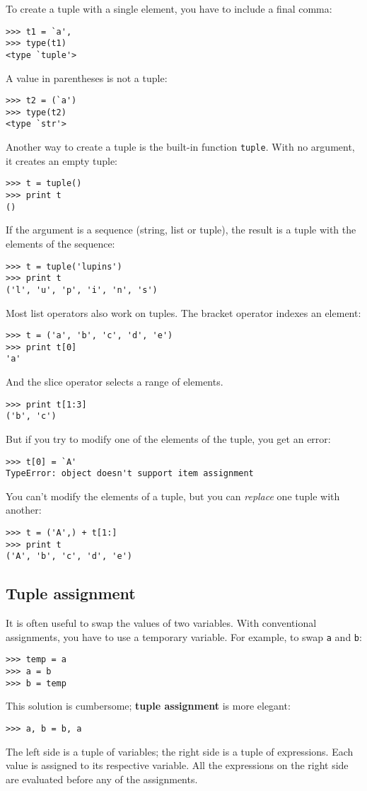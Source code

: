 \documentclass{article}
\begin{document}
To create a tuple with a single element, you have to include a final comma:
\begin{verbatim}
>>> t1 = `a',
>>> type(t1)
<type `tuple'>
\end{verbatim}
A value in parentheses is not a tuple:
\begin{verbatim}
>>> t2 = (`a')
>>> type(t2)
<type `str'>
\end{verbatim}
Another way to create a tuple is the built-in function \verb|tuple|.
With no argument, it creates an empty tuple:
\begin{verbatim}
>>> t = tuple()
>>> print t
()
\end{verbatim}
If the argument is a sequence (string, list or tuple), the result is a
tuple with the elements of the sequence:
\begin{verbatim}
>>> t = tuple('lupins')
>>> print t
('l', 'u', 'p', 'i', 'n', 's')
\end{verbatim}

Most list operators also work on tuples. The bracket operator indexes an
element:
\begin{verbatim}
>>> t = ('a', 'b', 'c', 'd', 'e')
>>> print t[0]
'a'
\end{verbatim}
And the slice operator selects a range of elements.
\begin{verbatim}
>>> print t[1:3]
('b', 'c')
\end{verbatim}
But if you try to modify one of the elements of the tuple, you get an error:
\begin{verbatim}
>>> t[0] = `A'
TypeError: object doesn't support item assignment
\end{verbatim}
You can’t modify the elements of a tuple, but you can \emph{replace}
one tuple with another:
\begin{verbatim}
>>> t = ('A',) + t[1:]
>>> print t
('A', 'b', 'c', 'd', 'e')
\end{verbatim}

\subsection{Tuple assignment}
It is often useful to swap the values of two variables. With conventional
assignments, you have to use a temporary variable.
For example, to swap \verb|a| and \verb|b|:
\begin{verbatim}
>>> temp = a
>>> a = b
>>> b = temp
\end{verbatim}
This solution is cumbersome; \textbf{tuple assignment} is more elegant:
\begin{verbatim}
>>> a, b = b, a
\end{verbatim}
The left side is a tuple of variables; the right side is a tuple of
expressions. Each value is assigned to its respective variable. All the
expressions on the right side are evaluated before any of the assignments.
\end{document}

